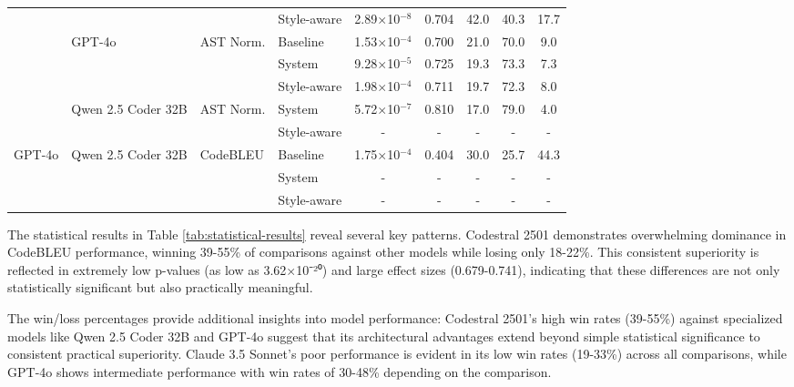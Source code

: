 \begin{table}[h!]
{\begin{tabular}{|l|l|l|l|c|c|c|c|c|}
\cline{4-9}
& & & Style-aware & 2.89$\times$10$^{-8}$ & 0.704 & 42.0 & 40.3 & 17.7 \\
\cline{2-9}
& \multirow{2}{*}{GPT-4o} & \multirow{2}{*}{AST Norm.} & Baseline & 1.53$\times$10$^{-4}$ & 0.700 & 21.0 & 70.0 & 9.0 \\
\cline{4-9}
& & & System & 9.28$\times$10$^{-5}$ & 0.725 & 19.3 & 73.3 & 7.3 \\
\cline{4-9}
& & & Style-aware & 1.98$\times$10$^{-4}$ & 0.711 & 19.7 & 72.3 & 8.0 \\
\cline{2-9}
& \multirow{2}{*}{Qwen 2.5 Coder 32B} & \multirow{2}{*}{AST Norm.} & System & 5.72$\times$10$^{-7}$ & 0.810 & 17.0 & 79.0 & 4.0 \\
\cline{4-9}
& & & Style-aware & - & - & - & - & - \\
\hline
\multirow{2}{*}{GPT-4o} & \multirow{2}{*}{Qwen 2.5 Coder 32B} & \multirow{2}{*}{CodeBLEU} & Baseline & 1.75$\times$10$^{-4}$ & 0.404 & 30.0 & 25.7 & 44.3 \\
\cline{4-9}
& & & System & - & - & - & - & - \\
\cline{4-9}
& & & Style-aware & - & - & - & - & - \\
\hline
\end{tabular}%
}
\end{table}

The statistical results in Table \ref{tab:statistical-results} reveal several key patterns. Codestral 2501 demonstrates overwhelming dominance in CodeBLEU performance, winning 39-55\% of comparisons against other models while losing only 18-22\%. This consistent superiority is reflected in extremely low p-values (as low as 3.62×10⁻²⁰) and large effect sizes (0.679-0.741), indicating that these differences are not only statistically significant but also practically meaningful.

The win/loss percentages provide additional insights into model performance: Codestral 2501's high win rates (39-55\%) against specialized models like Qwen 2.5 Coder 32B and GPT-4o suggest that its architectural advantages extend beyond simple statistical significance to consistent practical superiority. Claude 3.5 Sonnet's poor performance is evident in its low win rates (19-33\%) across all comparisons, while GPT-4o shows intermediate performance with win rates of 30-48\% depending on the comparison.

